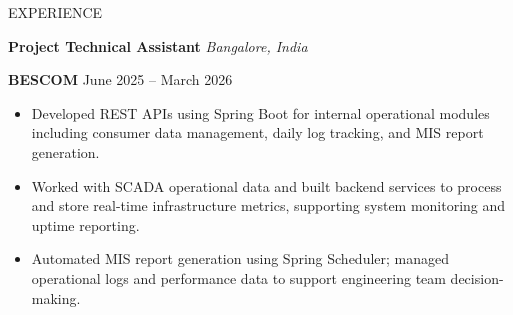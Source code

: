 \documentclass{resume}
\begin{document}
\begin{rSection}{EXPERIENCE}

\textbf{\textcolor{myblue}{Project Technical Assistant}}
\hfill \textit{Bangalore, India}

\textbf{\textcolor{companyblue}{BESCOM}}
\hfill \textcolor{companyblue}{June 2025 -- March 2026}

\begin{itemize}
\itemsep -3pt
\parsep 0pt
\partopsep 0pt
\topsep 2pt

\item Developed REST APIs using Spring Boot for internal operational modules including consumer data management, daily log tracking, and MIS report generation.

\item Worked with SCADA operational data and built backend services to process and store real-time infrastructure metrics, supporting system monitoring and uptime reporting.

\item Automated MIS report generation using Spring Scheduler; managed operational logs and performance data to support engineering team decision-making.

\end{itemize}

\end{rSection}

\end{document}
